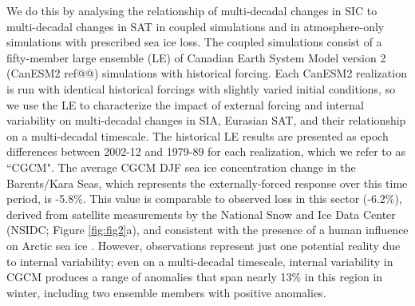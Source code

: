 \documentclass{nature}
\begin{document}
We do this by analysing the relationship of multi-decadal changes in SIC to multi-decadal changes in SAT in coupled simulations and in atmosphere-only simulations with prescribed sea ice loss. The coupled simulations consist of a fifty-member large ensemble (LE) of Canadian Earth System Model version 2 (CanESM2 ref@@) simulations with historical forcing. Each CanESM2 realization is run with identical historical forcings with slightly varied initial conditions, so we use the LE to characterize the impact of external forcing and internal variability on multi-decadal changes in SIA, Eurasian SAT, and their relationship on a multi-decadal timescale. The historical LE results are presented as epoch differences between 2002-12 and 1979-89 for each realization, which we refer to as ``CGCM". The average CGCM DJF sea ice concentration change in the Barents/Kara Seas, which represents the externally-forced response over this time period, is -5.8\%. This value is comparable to observed loss in this sector (-6.2\%), derived from satellite measurements by the National Snow and Ice Data Center (NSIDC; Figure \ref{fig:fig2}a), and consistent with the presence of a human influence on Arctic sea ice \cite{min08}. However, observations represent just one potential reality due to internal variability; even on a multi-decadal timescale, internal variability in CGCM produces a range of anomalies that span nearly 13\% in this region in winter, including two ensemble members with positive anomalies. %

\end{document}
